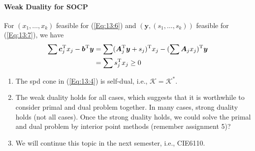 \paragraph{Weak Duality for SOCP}
For $( x_1,\dots, x_k)$ feasible for (\ref{Eq:13:6}) and $(\bm y,(s_1,\dots,s_k))$ feasible for (\ref{Eq:13:7}), we have
\begin{align*}
\sum\bm c_j^{\mathrm T} x_j-\bm b^{\mathrm T}\bm y&=\sum(\bm A_j^{\mathrm T}\bm y+s_j)^{\mathrm T} x_j-(\sum\bm A_j x_j)^{\mathrm T}\bm y\\
&=\sum s_j^{\mathrm T} x_j\ge0
\end{align*}
\begin{remark}
\begin{enumerate}
\item
The spd cone in (\ref{Eq:13:4}) is self-dual, i.e., $\mathcal{K}=\mathcal{K}^*$. 
\item
The weak duality holds for all cases, which suggests that it is worthwhile to consider primal and dual problem together. In many cases, strong duality holds (not all cases). Once the strong duality holds, we could solve the primal and dual problem by interior point methods (remember assignment 5)?
\item
We will continue this topic in the next semester, i.e., CIE6110.
\end{enumerate}
\end{remark}























